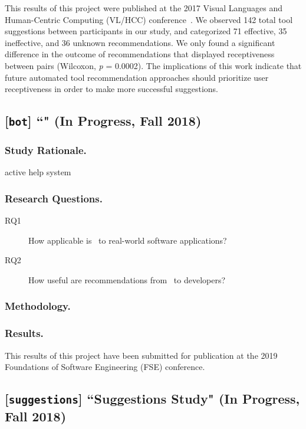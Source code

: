 \documentclass[runningheads]{llncs}
\begin{document}
This results of this project were published at the 2017 Visual Languages and Human-Centric Computing (VL/HCC) conference~\cite{Interactions}. We observed 142 total tool suggestions between participants in our study, and categorized 71 effective, 35 ineffective, and 36 unknown recommendations. We only found a significant difference in the outcome of recommendations that displayed receptiveness between pairs (Wilcoxon, \textit{p} = 0.0002). The implications of this work indicate that future automated tool recommendation approaches should prioritize user receptiveness in order to make more successful suggestions.

\subsection{[\texttt{bot}] ``\TOOL" (In Progress, Fall 2018)}

\subsubsection{Study Rationale.} 

active help system~\cite{Fischer1984ActiveHelpSystems}

\subsubsection{Research Questions.}

\begin{description}
  \item[RQ1] How applicable is \tool~to real-world software applications?
  \item[RQ2] How useful are recommendations from \tool~to developers?
\end{description}

\subsubsection{Methodology.}

\subsubsection{Results.} This results of this project have been submitted for publication at the 2019 Foundations of Software Engineering (FSE) conference.

\subsection{[\texttt{suggestions}] ``Suggestions Study" (In Progress, Fall 2018)}
\end{document}
